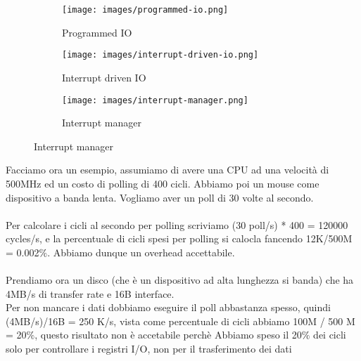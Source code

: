 \begin{figure}[h!]
    \centering
    \begin{subfigure}{.32\textwidth}
        \centering
        \texttt{[image: images/programmed-io.png]}
        \caption{Programmed IO}
    \end{subfigure}
    \begin{subfigure}{.32\textwidth}
        \centering
        \texttt{[image: images/interrupt-driven-io.png]}
        \caption{Interrupt driven IO}
    \end{subfigure}
    \begin{subfigure}{.32\textwidth}
        \centering
        \texttt{[image: images/interrupt-manager.png]}
        \caption{Interrupt manager}
    \end{subfigure}
\end{figure}

\begin{example}
    Facciamo ora un esempio, assumiamo di avere una CPU ad una velocità di 500MHz ed un costo di polling di 400 cicli. Abbiamo poi un mouse come dispositivo a banda lenta.
    Vogliamo aver un poll di 30 volte al secondo.\\\\
    Per calcolare i cicli al secondo per polling scriviamo (30 poll/s) * 400 = 120000 cycles/s, e la percentuale di cicli spesi
    per polling si calocla fancendo 12K/500M = 0.002\(\%\). Abbiamo dunque un overhead accettabile.\\\\
    Prendiamo ora un disco (che è un dispositivo ad alta lunghezza si banda) che ha 4MB/s di transfer rate e 16B interface.\\
    Per non mancare i dati dobbiamo eseguire il poll abbastanza spesso, quindi (4MB/s)/16B = 250 K/s, vista come percentuale di cicli
    abbiamo 100M / 500 M = 20\(\%\), questo risultato non è accetabile perchè Abbiamo speso il 20\(\%\) dei cicli solo per controllare i registri I/O, non per il trasferimento dei dati
\end{example}

